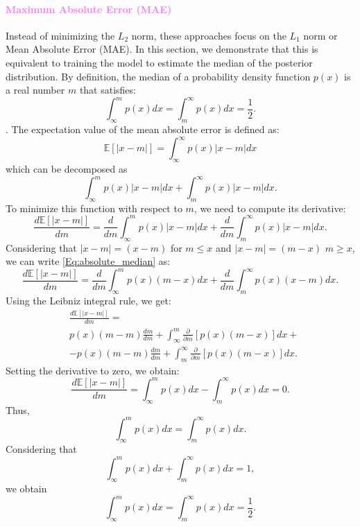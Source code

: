 \documentclass{aa}
\begin{document}
\paragraph{\textcolor{violet}{Maximum Absolute Error (MAE)}}
Instead of minimizing the $L_2$ norm, these approaches focus on the $L_1$ norm or Mean Absolute Error (MAE). In this section, we demonstrate that this is equivalent to training the model to estimate the median of the posterior distribution.
By definition, the median of a probability density function $p(x)$ is a real number $m$ that satisfies:
\begin{equation}\label{Eq:definition_median}
\int_{\infty}^{m} p(x)dx=\int_{m}^{\infty}p(x)dx=\frac{1}{2}.
\end{equation}. 
The expectation value of the mean absolute error is defined as:
\begin{equation}
    \mathbb{E}[|x-m|]= \int_{\infty}^{\infty}p(x)|x-m|dx  
\end{equation}
which can be decomposed as
\begin{equation}
        \int_{\infty}^{m}p(x)|x-m|dx +\int_{m}^{\infty}p(x)|x-m|dx .
\end{equation}
To minimize this function with respect to $m$, we need to compute its derivative:
\begin{equation}\label{Eq:absolute_median}
    \frac{d\mathbb{E}[|x-m|]}{dm}=
    \frac{d}{dm}\int_{\infty}^{m}p(x)|x-m|dx +\frac{d}{dm}\int_{m}^{\infty}p(x)|x-m|dx. 
\end{equation}
Considering that $|x-m|=(x-m)$ for $m\le x$ and $|x-m|=(m-x)$ $m\ge x$, 
we can write \autoref{Eq:absolute_median} as:
\begin{equation}
    \frac{d\mathbb{E}[|x-m|]}{dm}=
    \frac{d}{dm}\int_{\infty}^{m}p(x)(m-x)dx +\frac{d}{dm}\int_{m}^{\infty}p(x)(x-m)dx .
\end{equation}
Using the Leibniz integral rule, we get:
\begin{align}
    &\frac{d\mathbb{E}[|x-m|]}{dm}= \\
    &
    p(x)(m-m)\frac{dm}{dm}+\int_{\infty}^{m}\frac{\partial}{\partial m}[p(x)(m-x)]dx + \nonumber \\
    & - p(x)(m-m)\frac{dm}{dm}+\int_{m}^{\infty}\frac{\partial}{\partial m}[p(x)(m-x)]dx \nonumber .
\end{align}
Setting the derivative to zero, we obtain:
\begin{equation}
    \frac{d\mathbb{E}[|x-m|]}{dm}= \int_{\infty}^{m} p(x)dx-\int_{m}^{\infty}p(x)dx =0.
\end{equation}
Thus,
\begin{equation}
\int_{\infty}^{m} p(x)dx=\int_{m}^{\infty}p(x)dx .
\end{equation}
Considering that
\begin{equation}
\int_{\infty}^{m} p(x)dx+\int_{m}^{\infty}p(x)dx=1,
\end{equation}
we obtain 
\begin{equation}\label{Eq:definition_median}
\int_{\infty}^{m} p(x)dx=\int_{m}^{\infty}p(x)dx=\frac{1}{2}.
\end{equation}
\end{document}
